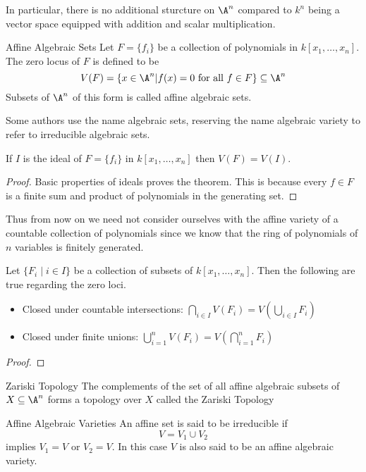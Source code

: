 \documentclass[a4paper]{article}
\begin{document}
In particular, there is no additional sturcture on $\A^n$ compared to $k^n$ being a vector space equipped with addition and scalar multiplication. 

\begin{defn}{Affine Algebraic Sets}{} Let $F=\{f_i\}$ be a collection of polynomials in $k[x_1,\dots,x_n]$. The zero locus of $F$ is defined to be $$V(F)=\{x\in\A^n|f(x)=0\text{ for all }f\in F\}\subseteq\A^n$$ Subsets of $\A^n$ of this form is called affine algebraic sets. 
\end{defn}

Some authors use the name algebraic sets, reserving the name algebraic variety to refer to irreducible algebraic sets. 

\begin{prp}{}{} If $I$ is the ideal of $F=\{f_i\}$ in $k[x_1,\dots,x_n]$ then $V(F)=V(I)$. \tcbline
\begin{proof}
Basic properties of ideals proves the theorem. This is because every $f\in F$ is a finite sum and product of polynomials in the generating set. 
\end{proof}
\end{prp}

Thus from now on we need not consider ourselves with the affine variety of a countable collection of polynomials since we know that the ring of polynomials of $n$ variables is finitely generated. 

\begin{prp}{}{} Let $\{F_i\;|\;i\in I\}$ be a collection of subsets of $k[x_1,\dots,x_n]$. Then the following are true regarding the zero loci. 
\begin{itemize}
\item Closed under countable intersections: $\bigcap_{i\in I}V(F_i)=V\left(\bigcup_{i\in I}F_i\right)$
\item Closed under finite unions: $\bigcup_{i=1}^nV(F_i)=V\left(\bigcap_{i=1}^nF_i\right)$
\end{itemize}\tcbline
\begin{proof}
\end{proof}
\end{prp}

\begin{prp}{Zariski Topology}{} The complements of the set of all affine algebraic subsets of $X\subseteq\A^n$ forms a topology over $X$ called the Zariski Topology
\end{prp}

\begin{defn}{Affine Algebraic Varieties}{} An affine set is said to be irreducible if $$V=V_1\cup V_2$$ implies $V_1=V$ or $V_2=V$. In this case $V$ is also said to be an affine algebraic variety. 
\end{defn}
\end{document}
